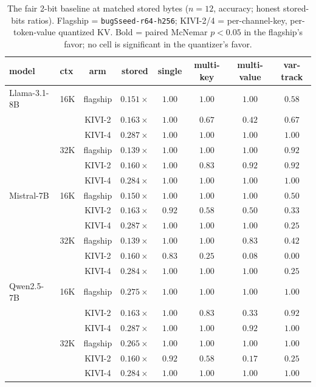 \documentclass[11pt]{article}
\begin{document}
\begin{table}[t]
\centering
\caption{The fair 2-bit baseline at matched stored bytes ($n{=}12$, accuracy; honest
stored-bits ratios). Flagship = \texttt{bugSseed-r64-h256}; KIVI-2/4 = per-channel-key,
per-token-value quantized KV. Bold = paired McNemar $p<0.05$ in the flagship's favor;
no cell is significant in the quantizer's favor.}
\label{tab:fairquant}
\small
\begin{tabular}{llcccccc}
\toprule
model & ctx & arm & stored & single & multi-key & multi-value & var-track \\
\midrule
Llama-3.1-8B & 16K & flagship & $0.151\times$ & $1.00$ & $1.00$ & $\mathbf{1.00}$ & $0.58$ \\
             &     & KIVI-2   & $0.163\times$ & $1.00$ & $0.67$ & $0.42$ & $0.67$ \\
             &     & KIVI-4   & $0.287\times$ & $1.00$ & $1.00$ & $1.00$ & $1.00$ \\
             & 32K & flagship & $0.139\times$ & $1.00$ & $1.00$ & $1.00$ & $0.92$ \\
             &     & KIVI-2   & $0.160\times$ & $1.00$ & $0.83$ & $0.92$ & $0.92$ \\
             &     & KIVI-4   & $0.284\times$ & $1.00$ & $1.00$ & $1.00$ & $1.00$ \\
\midrule
Mistral-7B   & 16K & flagship & $0.150\times$ & $1.00$ & $1.00$ & $\mathbf{1.00}$ & $0.50$ \\
             &     & KIVI-2   & $0.163\times$ & $0.92$ & $0.58$ & $0.50$ & $0.33$ \\
             &     & KIVI-4   & $0.287\times$ & $1.00$ & $1.00$ & $1.00$ & $0.25$ \\
             & 32K & flagship & $0.139\times$ & $1.00$ & $\mathbf{1.00}$ & $\mathbf{0.83}$ & $0.42$ \\
             &     & KIVI-2   & $0.160\times$ & $0.83$ & $0.25$ & $0.08$ & $0.00$ \\
             &     & KIVI-4   & $0.284\times$ & $1.00$ & $1.00$ & $1.00$ & $0.25$ \\
\midrule
Qwen2.5-7B   & 16K & flagship & $0.275\times$ & $1.00$ & $1.00$ & $\mathbf{1.00}$ & $1.00$ \\
             &     & KIVI-2   & $0.163\times$ & $1.00$ & $0.83$ & $0.33$ & $0.92$ \\
             &     & KIVI-4   & $0.287\times$ & $1.00$ & $1.00$ & $0.92$ & $1.00$ \\
             & 32K & flagship & $0.265\times$ & $1.00$ & $1.00$ & $\mathbf{1.00}$ & $\mathbf{1.00}$ \\
             &     & KIVI-2   & $0.160\times$ & $0.92$ & $0.58$ & $0.17$ & $0.25$ \\
             &     & KIVI-4   & $0.284\times$ & $1.00$ & $1.00$ & $1.00$ & $1.00$ \\
\bottomrule
\end{tabular}
\end{table}
\end{document}
